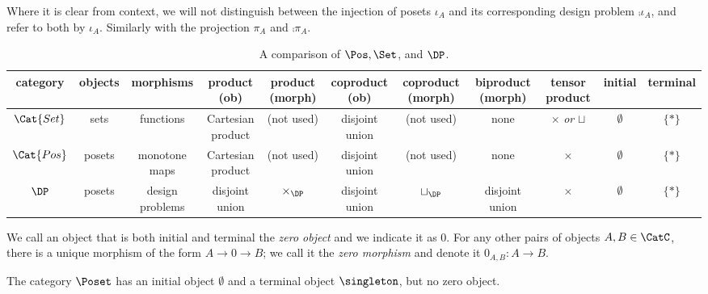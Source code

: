 \begin{remark}Where it is clear from context, we will not distinguish between the injection of posets $\iota_A$ and its corresponding design problem $\comp{\iota_A}$, and refer to both by $\iota_A$. Similarly with the projection $\pi_A$ and $\comp{\pi_A}$.
\end{remark}

\begin{table}[b]
\begin{tabular}{ccccccccccc}
    category &
    objects & morphisms &
    product (ob) & product (morph) & coproduct (ob) & coproduct (morph) & biproduct (morph) & tensor product &
    initial  & terminal\\
    \hline

    $\Cat{Set}$ &
    sets & functions &
    Cartesian product & (not used) & disjoint union & (not used) &
    none & $\times$ \emph{or} $\sqcup$ &
    $\emptyset$ & $\{\ast\}$ \\

    $\Cat{Pos}$ &
    posets & monotone maps &
    Cartesian product & (not used) & disjoint union & (not used) &
    none & $\times$ &
    $\emptyset$  & $\{\ast\}$\\

    $\DP$ &
    posets & design problems &
    disjoint union & $\times_\DP$ & disjoint union & $\sqcup_\DP$  &
    disjoint union & $\times$ &
    $\emptyset$ & $\{\ast\}$\\

\end{tabular}
\caption{A comparison of $\Pos, \Set$, and $\DP$.}
\end{table}

\begin{shaded}
\begin{definition}
We call an object that is both initial and terminal the \emph{zero object} and we indicate it as $0$. For any other pairs of objects  $A, B\in\CatC$, there is a unique morphism of the form $A \to 0\to B$; we call it the \emph{zero morphism} and denote it $0_{A,B}\colon A \to B$.
\end{definition}
\end{shaded}

\begin{example}The category $\Poset$ has an initial object $\emptyset$ and a terminal object $\singleton$, but no zero object.\end{example}

